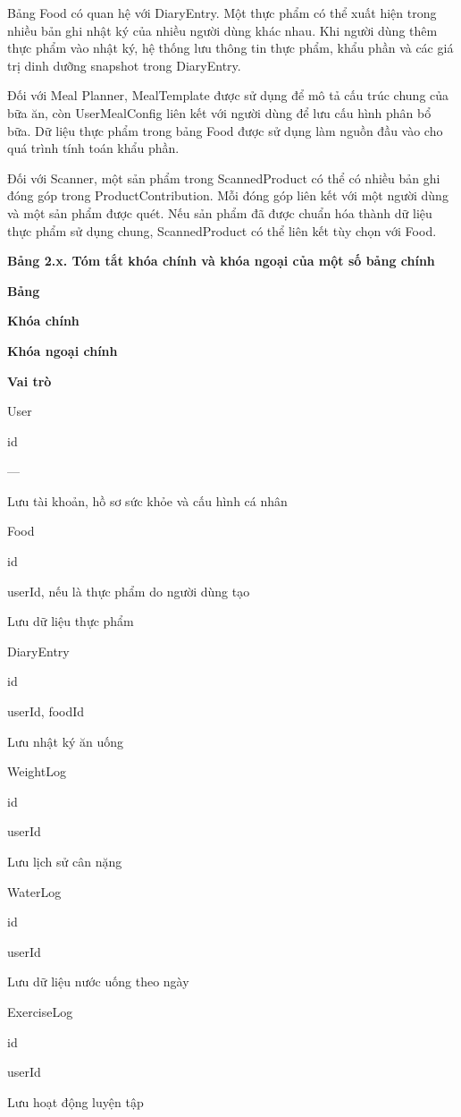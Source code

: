 \documentclass[12pt, a4paper]{report}
\begin{document}
Bảng Food có quan hệ với DiaryEntry. Một thực phẩm có thể xuất hiện trong nhiều bản ghi nhật ký của nhiều người dùng khác nhau. Khi người dùng thêm thực phẩm vào nhật ký, hệ thống lưu thông tin thực phẩm, khẩu phần và các giá trị dinh dưỡng snapshot trong DiaryEntry.

Đối với Meal Planner, MealTemplate được sử dụng để mô tả cấu trúc chung của bữa ăn, còn UserMealConfig liên kết với người dùng để lưu cấu hình phân bổ bữa. Dữ liệu thực phẩm trong bảng Food được sử dụng làm nguồn đầu vào cho quá trình tính toán khẩu phần.

Đối với Scanner, một sản phẩm trong ScannedProduct có thể có nhiều bản ghi đóng góp trong ProductContribution. Mỗi đóng góp liên kết với một người dùng và một sản phẩm được quét. Nếu sản phẩm đã được chuẩn hóa thành dữ liệu thực phẩm sử dụng chung, ScannedProduct có thể liên kết tùy chọn với Food.

\textbf{Bảng 2.x. Tóm tắt khóa chính và khóa ngoại của một số bảng chính}

\textbf{Bảng}

\textbf{Khóa chính}

\textbf{Khóa ngoại chính}

\textbf{Vai trò}

User

id

—

Lưu tài khoản, hồ sơ sức khỏe và cấu hình cá nhân

Food

id

userId, nếu là thực phẩm do người dùng tạo

Lưu dữ liệu thực phẩm

DiaryEntry

id

userId, foodId

Lưu nhật ký ăn uống

WeightLog

id

userId

Lưu lịch sử cân nặng

WaterLog

id

userId

Lưu dữ liệu nước uống theo ngày

ExerciseLog

id

userId

Lưu hoạt động luyện tập
\end{document}
